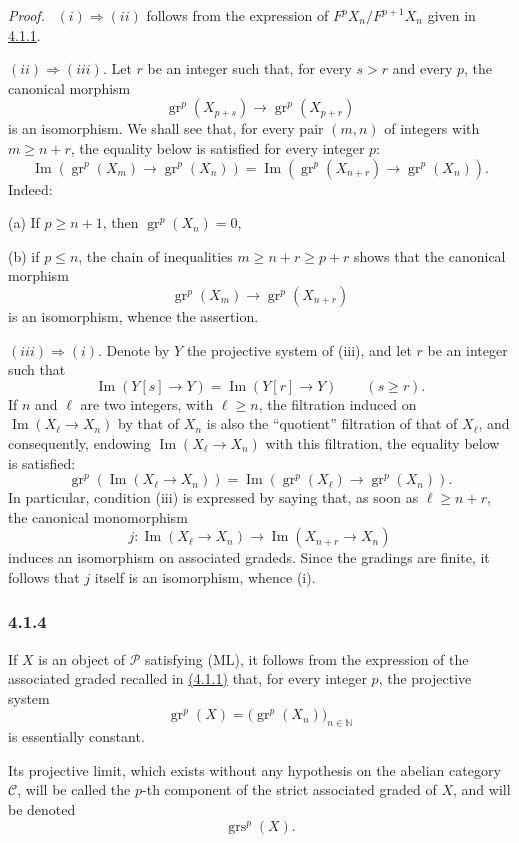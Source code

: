 \documentclass[11pt]{article}
\newenvironment{prooftext}[1][Proof]{\par\noindent\emph{#1.}\ }{\par\medskip}
\providecommand{\gr}{\operatorname{gr}}
\providecommand{\Im}{\operatorname{Im}}
\providecommand{\gr}{\operatorname{gr}}
\renewcommand{\Im}{\operatorname{Im}}
\providecommand{\gr}{\operatorname{gr}}
\providecommand{\grs}{\operatorname{grs}}
\providecommand{\Im}{\operatorname{Im}}
\begin{document}
\begin{prooftext}[Proof]
$(i)\Rightarrow(ii)$ follows from the expression of $F^pX_n/F^{p+1}X_n$ given in \hyperref[sga5:V:subsubsection:4.1.1]{4.1.1}.

$(ii)\Rightarrow(iii)$. Let $r$ be an integer such that, for every $s>r$ and every $p$, the canonical morphism
\[
\gr^p(X_{p+s})\longrightarrow \gr^p(X_{p+r})
\]
is an isomorphism. We shall see that, for every pair $(m,n)$ of integers with $m\ge n+r$, the equality below is satisfied for every integer $p$:
\[
\Im(\gr^p(X_m)\to\gr^p(X_n))=
\Im(\gr^p(X_{n+r})\to\gr^p(X_n)).
\]
Indeed:

(a) If $p\ge n+1$, then $\gr^p(X_n)=0$,

(b) if $p\le n$, the chain of inequalities $m\ge n+r\ge p+r$ shows that the canonical morphism
\[
\gr^p(X_m)\longrightarrow\gr^p(X_{n+r})
\]
is an isomorphism, whence the assertion.

$(iii)\Rightarrow(i)$. Denote by $Y$ the projective system of (iii), and let $r$ be an integer such that
\[
\Im(Y[s]\to Y)=\Im(Y[r]\to Y)\qquad(s\ge r).
\]
If $n$ and $\ell$ are two integers, with $\ell\ge n$, the filtration induced on $\Im(X_\ell\to X_n)$ by that of $X_n$ is also the ``quotient'' filtration of that of $X_\ell$, and consequently, endowing $\Im(X_\ell\to X_n)$ with this filtration, the equality below is satisfied:
\[
\gr^p(\Im(X_\ell\to X_n))=
\Im(\gr^p(X_\ell)\to\gr^p(X_n)).
\]
In particular, condition (iii) is expressed by saying that, as soon as $\ell\ge n+r$, the canonical monomorphism
\[
j:\Im(X_\ell\to X_n)\longrightarrow\Im(X_{n+r}\to X_n)
\]
induces an isomorphism on associated gradeds. Since the gradings are finite, it follows that $j$ itself is an isomorphism, whence (i).
\end{prooftext}


\subsubsection*{4.1.4}\label{sga5:V:subsubsection:4.1.4}
If \(X\) is an object of \(\mathcal P\) satisfying (ML), it follows from the expression of the associated graded recalled in \hyperref[sga5:V:subsubsection:4.1.1]{(4.1.1)} that, for every integer \(p\), the projective system
\[
\gr^p(X)=\bigl(\gr^p(X_n)\bigr)_{n\in\mathbb N}
\]
is essentially constant.

Its projective limit, which exists without any hypothesis on the abelian category \(\mathcal C\), will be called the \(p\)-th component of the strict associated graded of \(X\), and will be denoted
\[
\grs^p(X).
\]
\end{document}
